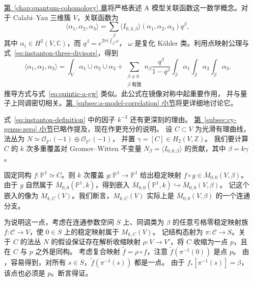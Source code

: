 \hyperref[chap:quantum-cohomology]{第~\ref*{chap:quantum-cohomology} 章}将严格表述 A 模型关联函数这一数学概念。对于 Calabi--Yau 三维簇 $V$，关联函数为
\[
\langle\alpha_1,\alpha_2,\alpha_3\rangle
=\sum_\beta\langle I_{0,3,\beta}\rangle(\alpha_1,\alpha_2,\alpha_3)q^\beta,
\]
其中 $\alpha_i\in H^2(V,\mathbb C)$，而 $q^\beta=e^{2\pi i\int_\beta\omega}$，
$\omega$ 是复化 Kähler 类。利用点映射公理与式~\eqref{eq:instanton-three-divisors}，得到
\begin{equation}\label{eq:cy-a-correlation-instanton}
\langle\alpha_1,\alpha_2,\alpha_3\rangle
=\int_V\alpha_1\cup\alpha_2\cup\alpha_3
+\sum_{\substack{\beta\ne0\\\beta\text{ 有效}}}n_\beta\frac{q^\beta}{1-q^\beta}
\int_\beta\alpha_1\int_\beta\alpha_2\int_\beta\alpha_3.
\end{equation}
推导方式与式~\eqref{eq:quintic-a-gw} 类似。此公式在镜像对称中起重要作用，
并与量子上同调密切相关。\hyperref[subsec:a-model-correlation]{第~\ref*{subsec:a-model-correlation} 小节}将更详细地讨论它。

式~\eqref{eq:instanton-definition} 中的因子 $k^{-3}$ 还有更深刻的理由。
\hyperref[subsec:cy-genus-zero]{第~\ref*{subsec:cy-genus-zero} 小节}已略作提及，现在作更充分的说明。
设 $C\subset V$ 为光滑有理曲线，法丛为
$N\simeq\mathcal O_{\mathbb P^1}(-1)\oplus\mathcal O_{\mathbb P^1}(-1)$，
并置 $\gamma=[C]\in H_2(V,\mathbb Z)$。
我们要计算 $C$ 的 $k$ 次多重覆盖对 Gromov--Witten 不变量
$N_\beta=\langle I_{0,0,\beta}\rangle$ 的贡献，其中 $\beta=k\gamma$。

固定同构 $f:\mathbb P^1\simeq C$。则 $k$ 次覆盖 $g:\mathbb P^1\to\mathbb P^1$
给出稳定映射 $f\circ g\in\overline M_{0,0}(V,\beta)$。
由于 $g$ 自然属于 $\overline M_{0,0}(\mathbb P^1,k)$，得到嵌入
$\overline M_{0,0}(\mathbb P^1,k)\hookrightarrow\overline M_{0,0}(V,\beta)$。
记这个嵌入的像为 $M_{k,C}(V)$。我们断言，$M_{k,C}(V)$ 实际上是 $\overline M_{0,0}(V,\beta)$ 的一个连通分支。

为说明这一点，考虑在连通参数空间 $S$ 上、同调类为 $\beta$ 的任意亏格零稳定映射族
$f:\mathcal C\to V$，使 $0\in S$ 上的稳定映射属于 $M_{k,C}(V)$。
记结构态射为 $\pi:\mathcal C\to S$。关于 $C$ 的法丛 $N$ 的假设保证存在解析收缩映射
$\rho:V\to V'$，将 $C$ 收缩为一点 $p$，且在 $C$ 与 $p$ 之外是同构。
考虑复合映射 $\widetilde f=\rho\circ f$，注意 $\widetilde f(\pi^{-1}(0))$ 是点 $p$。
由 ，容易得到，对所有 $s\in S$，$\widetilde f(\pi^{-1}(s))$ 都是一点。
由于 $f_*[\pi^{-1}(s)]=\beta$，该点也必须是 $p$。断言得证。


